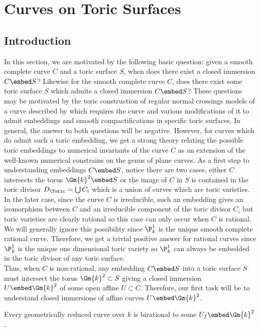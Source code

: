 
\section{Curves on Toric Surfaces}


\subsection{Introduction}

In this section, we are motivated by the following basic question: given a smooth complete curve $C$ and a toric surface $S$, when does there exist a closed immersion $C \embed S$? Likewise for the smooth complete curve $C$, does there exist some toric surface $S$ which admits a closed immersion $C \embed S$? These questions may be motivated by the toric construction of regular normal crossings models of a curve described by \cite{tim} which requires the curve and various modifications of it to admit embeddings and smooth compactifications in specific toric surfaces. In general, the answer to both questions will be negative. However, for curves which do admit such a toric embedding, we get a strong theory relating the possible toric embeddings to numerical invariants of the curve $C$ as an extension of the well-known numerical constrains on the genus of plane curves. As a first step to understanding embeddings $C \embed S$, notice there are two cases, either $C$ intersects the torus $\Gm{k}^2 \embed S$ or the image of $C$ in $S$ is contained in the toric divisor $D_{\Toric} = \bigcup C_i$ which is a union of curves which are toric varieties. In the later case, since the curve $C$ is irreducible, such an embedding gives an isomorphism between $C$ and an irreducible component of the toric divisor $C_i$ but toric varieties are clearly rational so this case can only occur when $C$ is rational. We will generally ignore this possibility since $\P^1_k$ is the unique smooth complete rational curve. Therefore, we get a trivial positive answer for rational curves since $\P^1_k$ is the unique one dimensional toric variety so $\P^1_k$ can always be embedded in the toric divisor of any toric surface.
\bigskip\\
Thus, when $C$ is non-rational, any embedding $C \embed S$ into a toric surface $S$ must intersect the torus $\Gm{k}^2 \subset S$ giving a closed immersion $U \embed \Gm{k}^2$ of some open affine $U \subset C$. Therefore, our first task will be to understand closed immersions of affine curves $U \embed \Gm{k}^2$.

\begin{lemma}
Every geometrically reduced curve over $k$ is birational to some $U_f \embed \Gm{k}^2$.
\end{lemma}

